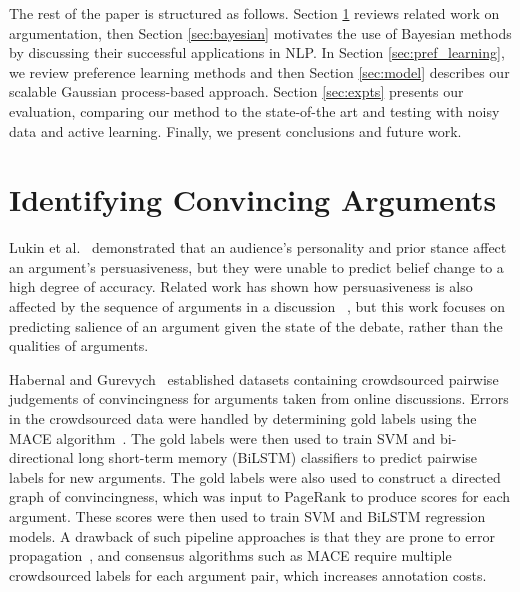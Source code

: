 The rest of the paper is structured as follows.
Section \ref{sec:related} reviews related work on argumentation,
then Section \ref{sec:bayesian} motivates the use of Bayesian methods by discussing their successful applications in NLP.
In Section \ref{sec:pref_learning}, we review preference learning methods and then Section \ref{sec:model}
describes our scalable Gaussian process-based approach.
Section \ref{sec:expts} presents our evaluation, 
comparing our method to the state-of-the art and testing with noisy data and active learning.
Finally, we present conclusions and future work.

\section{Identifying Convincing Arguments}\label{sec:related}

Lukin et al.~ demonstrated that an audience's personality and prior stance affect
an argument's persuasiveness, but they were unable to predict belief change to a high degree of accuracy.
Related work has shown how persuasiveness is also affected by the sequence of arguments in a discussion 
~\cite{tan2016winning,rosenfeld2016providing,monteserin2013reinforcement},
but this work focuses on predicting salience of an argument given the state of the debate,
 rather than the qualities of arguments.

Habernal and Gurevych~ established datasets
containing crowdsourced pairwise judgements of convincingness for arguments taken from online discussions. 
Errors in the crowdsourced data were handled by determining gold labels using the MACE algorithm~\cite{hovy2013learning}.
The gold labels were then used to train SVM and bi-directional long short-term memory (BiLSTM) classifiers to predict pairwise
labels for new arguments. 
The gold labels were also used to construct a directed graph of convincingness, which was input to PageRank 
to produce scores for each argument. 
These scores were then used to train SVM and BiLSTM regression models.
A drawback of such pipeline approaches is that they are prone to error propagation~\cite{chen2016joint},
and consensus algorithms such as MACE require multiple crowdsourced labels for each argument pair, 
which increases annotation costs.

